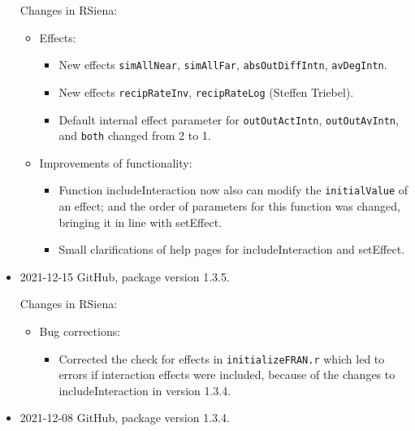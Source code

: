 \documentclass[a4paper,fleqn,11pt]{article}
\newcommand{\+}{\, + \,}
\newcommand{\sfn}[1]{\textsf{#1}}
\begin{document}
\begin{small}
\begin{itemize}
Changes in RSiena:
\begin{itemize}
\item  Effects:
\begin{itemize}
  \item New effects  \texttt{simAllNear}, \texttt{simAllFar}, \texttt{absOutDiffIntn}, \texttt{avDegIntn}.
  \item New effects \texttt{recipRateInv}, \texttt{recipRateLog} (Steffen Triebel).
  \item Default internal effect parameter for \texttt{outOutActIntn}, \texttt{outOutAvIntn},
    and \texttt{both} changed from 2 to 1.
\end{itemize}
\item Improvements of functionality:
\begin{itemize}
   \item Function \sfn{includeInteraction} now also can modify the \texttt{initialValue}
     of an effect; and the order of parameters for this function was changed,
     bringing it in line with \sfn{setEffect}.
   \item Small clarifications of help pages for \sfn{includeInteraction} and
     \sfn{setEffect}.
\end{itemize}

\end{itemize}

\item 2021-12-15 GitHub, package version 1.3.5.

Changes in RSiena:
\begin{itemize}
\item Bug corrections:
   \begin{itemize}
   \item Corrected the check for effects in  \texttt{initializeFRAN.r}
     which led to errors if interaction effects were included,
     because of the changes to \sfn{includeInteraction} in version 1.3.4.
    \end{itemize}
\end{itemize}


\item 2021-12-08 GitHub, package version 1.3.4.


\end{itemize}
\end{small}
\end{document}
